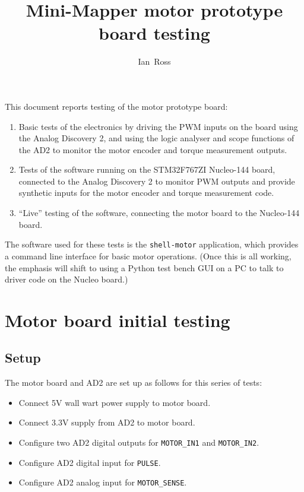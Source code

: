 \documentclass[a4paper,11pt]{article}
\title{Mini-Mapper motor prototype board testing}
\author{Ian~Ross}
\begin{document}
\maketitle

This document reports testing of the motor prototype board:

\begin{enumerate}
  \item{Basic tests of the electronics by driving the PWM inputs on
    the board using the Analog Discovery 2, and using the logic
    analyser and scope functions of the AD2 to monitor the motor
    encoder and torque measurement outputs.}
  \item{Tests of the software running on the STM32F767ZI Nucleo-144
    board, connected to the Analog Discovery 2 to monitor PWM outputs
    and provide synthetic inputs for the motor encoder and torque
    measurement code.}
  \item{``Live'' testing of the software, connecting the motor board
    to the Nucleo-144 board.}
\end{enumerate}

The software used for these tests is the \texttt{shell-motor}
application, which provides a command line interface for basic motor
operations. (Once this is all working, the emphasis will shift to
using a Python test bench GUI on a PC to talk to driver code on the
Nucleo board.)

\section{Motor board initial testing}

\subsection*{Setup}

The motor board and AD2 are set up as follows for this series of
tests:
\begin{itemize}
  \item{Connect 5V wall wart power supply to motor board.}
  \item{Connect 3.3V supply from AD2 to motor board.}
  \item{Configure two AD2 digital outputs for \texttt{MOTOR\_IN1} and
    \texttt{MOTOR\_IN2}.}
  \item{Configure AD2 digital input for \texttt{PULSE}.}
  \item{Configure AD2 analog input for \texttt{MOTOR\_SENSE}.}
\end{itemize}
\end{document}
